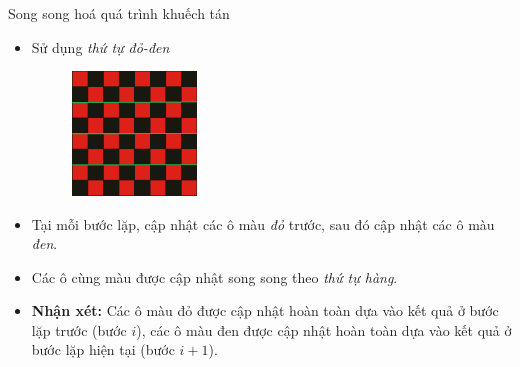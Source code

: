 \begin{frame}{Song song hoá quá trình khuếch tán}
\begin{itemize}
    \item Sử dụng \emph{thứ tự đỏ-đen}
    \begin{figure}[H]
        \centering
        \includegraphics[width=33mm]{img/red-black-grid.png}
    \end{figure}
	\item Tại mỗi bước lặp, cập nhật các ô màu \emph{đỏ} trước, sau đó cập nhật các ô màu \emph{đen}.
	\item Các ô cùng màu được cập nhật song song theo \emph{thứ tự hàng}.
	\item \textbf{Nhận xét:} Các ô màu đỏ được cập nhật hoàn toàn dựa vào kết quả ở bước lặp trước (bước $i$), các ô màu đen được cập nhật hoàn toàn dựa vào kết quả ở bước lặp hiện tại (bước $i + 1$).
\end{itemize}
\end{frame}